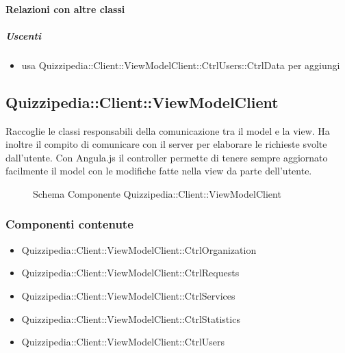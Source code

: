 \paragraph{Relazioni con altre classi}
\subparagraph{Uscenti}
\begin{itemize}
\item usa Quizzipedia::Client::ViewModelClient::CtrlUsers::CtrlData per aggiungi
\end{itemize}
\subsection{Quizzipedia::Client::ViewModelClient}
Raccoglie le classi responsabili della comunicazione tra il model e la view. Ha inoltre il compito di comunicare con il server per elaborare le richieste svolte dall'utente.
Con Angula.js il controller permette di tenere sempre aggiornato facilmente il model con le modifiche fatte nella view da parte dell'utente.
\begin{figure}[H]
\centering
\noindent{}
\caption[Schema Componente Quizzipedia::Client::ViewModelClient]{Schema Componente Quizzipedia::Client::ViewModelClient}
\end{figure}
\subsubsection{Componenti contenute}
\begin{itemize}
\item Quizzipedia::Client::ViewModelClient::CtrlOrganization
\item Quizzipedia::Client::ViewModelClient::CtrlRequests
\item Quizzipedia::Client::ViewModelClient::CtrlServices
\item Quizzipedia::Client::ViewModelClient::CtrlStatistics
\item Quizzipedia::Client::ViewModelClient::CtrlUsers
\end{itemize}
